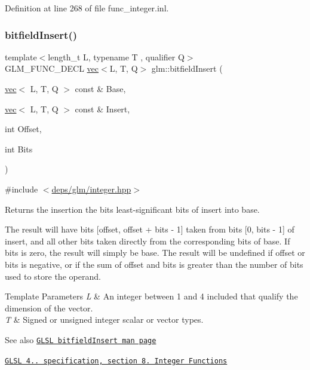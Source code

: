 Definition at line 268 of file func\+\_\+integer.\+inl.

\mbox{\label{group__core__func__integer_ga2e82992340d421fadb61a473df699b20}} 
\subsubsection{\texorpdfstring{bitfield\+Insert()}{bitfieldInsert()}}
{\footnotesize\ttfamily template$<$length\+\_\+t L, typename T , qualifier Q$>$ \\
G\+L\+M\+\_\+\+F\+U\+N\+C\+\_\+\+D\+E\+CL \hyperlink{structglm_1_1vec}{vec}$<$L, T, Q$>$ glm\+::bitfield\+Insert (\begin{DoxyParamCaption}\item[{\hyperlink{structglm_1_1vec}{vec}$<$ L, T, Q $>$ const \&}]{Base,  }\item[{\hyperlink{structglm_1_1vec}{vec}$<$ L, T, Q $>$ const \&}]{Insert,  }\item[{int}]{Offset,  }\item[{int}]{Bits }\end{DoxyParamCaption})}



{\ttfamily \#include $<$\hyperlink{integer_8hpp}{deps/glm/integer.\+hpp}$>$}

Returns the insertion the bits least-\/significant bits of insert into base.

The result will have bits \mbox{[}offset, offset + bits -\/ 1\mbox{]} taken from bits \mbox{[}0, bits -\/ 1\mbox{]} of insert, and all other bits taken directly from the corresponding bits of base. If bits is zero, the result will simply be base. The result will be undefined if offset or bits is negative, or if the sum of offset and bits is greater than the number of bits used to store the operand.


\begin{DoxyTemplParams}{Template Parameters}
{\em L} & An integer between 1 and 4 included that qualify the dimension of the vector. \\
\hline
{\em T} & Signed or unsigned integer scalar or vector types.\\
\hline
\end{DoxyTemplParams}
\begin{DoxySeeAlso}{See also}
\href{http://www.opengl.org/sdk/docs/manglsl/xhtml/bitfieldInsert.xml}{\tt G\+L\+SL bitfield\+Insert man page} 

\href{http://www.opengl.org/registry/doc/GLSLangSpec.4.20.8.pdf}{\tt G\+L\+SL 4.. specification, section 8. Integer Functions} 
\end{DoxySeeAlso}


